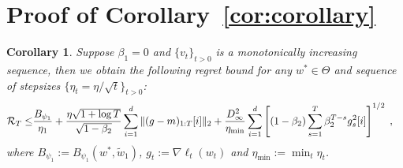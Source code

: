 \documentclass[twoside]{article}
\newtheorem*{Corollary*}{Corollary}
\begin{document}
\vspace{0.2in}

\section{Proof of Corollary~\ref{cor:corollary}}
\begin{Corollary*}
Suppose $\beta_1=0$ and $\{v_t\}_{t>0}$ is a monotonically increasing sequence, then we obtain the following regret bound for any $w^{*} \in \Theta$ and sequence of stepsizes $\{ \eta_t = \eta/\sqrt{t}\}_{t>0}$: 
\begin{equation}\notag
\begin{aligned}
\mathcal{R}_T \leq & \frac{ B_{\psi_1}}{\eta_1}
+ \frac{\eta \sqrt{1 + \log T}}{\sqrt{1 - \beta_2}} \sum_{i=1}^d \| (g-m)_{1:T}[i] \|_2 +\frac{D_{\infty}^2}{\eta_{\min}} \sum_{i=1}^d \left[ (1-\beta_2) \sum_{s=1}^{T} \beta_2^{T-s} g^2_s[i] \right]^{1/2} \;,
\end{aligned}
\end{equation}
where $B_{\psi_1} := B_{\psi_1}(w^*, \tilde{w}_{1})$, $g_{t}:= \nabla \ell_{t}(w_t)$ and $\eta_{{\min}} := \min_{{t}} \eta_{t}$.
\end{Corollary*}
\end{document}
